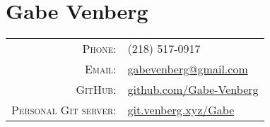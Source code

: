 \documentclass[letterpaper,10pt]{article}
\begin{document}
\pagestyle{empty}%
\section*{Gabe Venberg}
	\begin{tabular}{rl}
	\textsc{Phone:} & (218) 517-0917\\
	\textsc{Email:} & \href{mailto:gabevenberg@gmail.com}{gabevenberg@gmail.com}\\
	\textsc{GitHub:} & \href{https://github.com/Gabe-Venberg}{github.com/Gabe-Venberg}\\
	\textsc{Personal Git server:} & \href{https://git.venberg.xyz/Gabe}{git.venberg.xyz/Gabe}\\
	\end{tabular}
\end{document}
